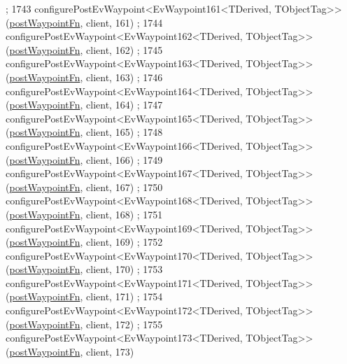 \begin{DoxyCode}
      ;
1743     configurePostEvWaypoint<EvWaypoint161<TDerived, TObjectTag>>(\hyperlink{classmove__base__z__client_1_1WaypointEventDispatcher_acc538eb7506c13f7cca2268a1742dadd}{postWaypointFn}, client, 161)
      ;
1744     configurePostEvWaypoint<EvWaypoint162<TDerived, TObjectTag>>(\hyperlink{classmove__base__z__client_1_1WaypointEventDispatcher_acc538eb7506c13f7cca2268a1742dadd}{postWaypointFn}, client, 162)
      ;
1745     configurePostEvWaypoint<EvWaypoint163<TDerived, TObjectTag>>(\hyperlink{classmove__base__z__client_1_1WaypointEventDispatcher_acc538eb7506c13f7cca2268a1742dadd}{postWaypointFn}, client, 163)
      ;
1746     configurePostEvWaypoint<EvWaypoint164<TDerived, TObjectTag>>(\hyperlink{classmove__base__z__client_1_1WaypointEventDispatcher_acc538eb7506c13f7cca2268a1742dadd}{postWaypointFn}, client, 164)
      ;
1747     configurePostEvWaypoint<EvWaypoint165<TDerived, TObjectTag>>(\hyperlink{classmove__base__z__client_1_1WaypointEventDispatcher_acc538eb7506c13f7cca2268a1742dadd}{postWaypointFn}, client, 165)
      ;
1748     configurePostEvWaypoint<EvWaypoint166<TDerived, TObjectTag>>(\hyperlink{classmove__base__z__client_1_1WaypointEventDispatcher_acc538eb7506c13f7cca2268a1742dadd}{postWaypointFn}, client, 166)
      ;
1749     configurePostEvWaypoint<EvWaypoint167<TDerived, TObjectTag>>(\hyperlink{classmove__base__z__client_1_1WaypointEventDispatcher_acc538eb7506c13f7cca2268a1742dadd}{postWaypointFn}, client, 167)
      ;
1750     configurePostEvWaypoint<EvWaypoint168<TDerived, TObjectTag>>(\hyperlink{classmove__base__z__client_1_1WaypointEventDispatcher_acc538eb7506c13f7cca2268a1742dadd}{postWaypointFn}, client, 168)
      ;
1751     configurePostEvWaypoint<EvWaypoint169<TDerived, TObjectTag>>(\hyperlink{classmove__base__z__client_1_1WaypointEventDispatcher_acc538eb7506c13f7cca2268a1742dadd}{postWaypointFn}, client, 169)
      ;
1752     configurePostEvWaypoint<EvWaypoint170<TDerived, TObjectTag>>(\hyperlink{classmove__base__z__client_1_1WaypointEventDispatcher_acc538eb7506c13f7cca2268a1742dadd}{postWaypointFn}, client, 170)
      ;
1753     configurePostEvWaypoint<EvWaypoint171<TDerived, TObjectTag>>(\hyperlink{classmove__base__z__client_1_1WaypointEventDispatcher_acc538eb7506c13f7cca2268a1742dadd}{postWaypointFn}, client, 171)
      ;
1754     configurePostEvWaypoint<EvWaypoint172<TDerived, TObjectTag>>(\hyperlink{classmove__base__z__client_1_1WaypointEventDispatcher_acc538eb7506c13f7cca2268a1742dadd}{postWaypointFn}, client, 172)
      ;
1755     configurePostEvWaypoint<EvWaypoint173<TDerived, TObjectTag>>(\hyperlink{classmove__base__z__client_1_1WaypointEventDispatcher_acc538eb7506c13f7cca2268a1742dadd}{postWaypointFn}, client, 173)

\end{DoxyCode}
